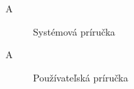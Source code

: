 
\chapter*{\appendixlistname}

\begin{description}
	\item[\appendixname{} A] Systémová príručka
    \item[\appendixname{} A] Používateľská príručka
\end{description}
